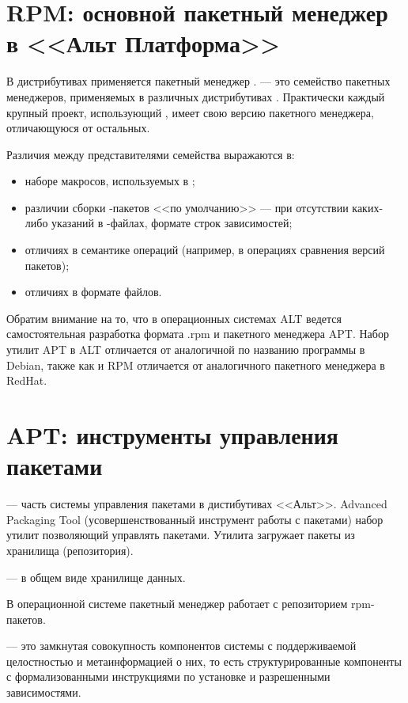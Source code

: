 \section{RPM: основной пакетный менеджер в <<Альт Платформа>>}
В дистрибутивах  применяется пакетный менеджер .  ---
это семейство пакетных менеджеров, применяемых в различных дистрибутивах .
Практически каждый крупный проект, использующий , имеет свою версию пакетного менеджера,
отличающуюся от остальных.

Различия между представителями семейства  выражаются в:

\begin{itemize}
	\item наборе макросов, используемых в ;
	\item различии сборки -пакетов <<по умолчанию>> --- при отсутствии каких-либо
	указаний в -файлах, формате строк зависимостей;
	\item отличиях в семантике операций (например, в операциях сравнения версий пакетов);
	\item отличиях в формате файлов.
\end{itemize}

Обратим внимание на то, что в операционных системах ALT ведется самостоятельная
разработка формата .rpm и пакетного менеджера APT. Набор утилит APT в ALT отличается
от аналогичной по названию программы в Debian, также как и RPM отличается от
аналогичного пакетного менеджера в RedHat.

\section{APT: инструменты управления пакетами}
 --- часть системы управления пакетами в дистибутивах <<Альт>>. Advanced Packaging Tool
(усовершенствованный инструмент работы с пакетами) набор утилит позволяющий управлять пакетами.
Утилита загружает пакеты из хранилища (репозитория).

 ---  в общем виде хранилище данных.

В операционной системе  пакетный менеджер работает с репозиторием rpm-пакетов.

 --- это замкнутая совокупность компонентов системы с
поддерживаемой целостностью и метаинформацией о них, то есть структурированные
компоненты с формализованными инструкциями по установке и разрешенными зависимостями.

